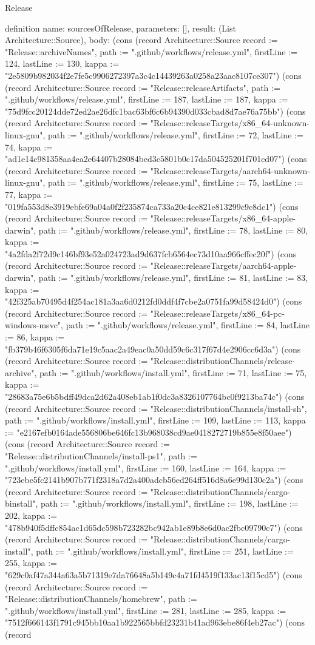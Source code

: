 \begin{lexlean}{Release}
\begin{semanticmodule}
definition{
  name: sourcesOfRelease,
  parameters: [],
  result: (List Architecture::Source),
  body: (cons (record Architecture::Source {record := "Release::archiveNames", path := ".github/workflows/release.yml", firstLine := 124, lastLine := 130, kappa := "2e5809b982034f2e7fe5c9906272397a3c4c14439263a0258a23aac8107ce307"}) (cons (record Architecture::Source {record := "Release::releaseArtifacts", path := ".github/workflows/release.yml", firstLine := 187, lastLine := 187, kappa := "75d9fcc20124dde72ed2ae26dfc1bac63bf6c6b94390d033cbad8d7ae76a75bb"}) (cons (record Architecture::Source {record := "Release::releaseTargets/x86_64-unknown-linux-gnu", path := ".github/workflows/release.yml", firstLine := 72, lastLine := 74, kappa := "ad1e14c981358aa4ea2e64407b28084bed3c5801b0c17da504525201f701cd07"}) (cons (record Architecture::Source {record := "Release::releaseTargets/aarch64-unknown-linux-gnu", path := ".github/workflows/release.yml", firstLine := 75, lastLine := 77, kappa := "019fa553d8e3919ebfe69a04a0f2f235874ca733a20c4ce821e813299c9c8dc1"}) (cons (record Architecture::Source {record := "Release::releaseTargets/x86_64-apple-darwin", path := ".github/workflows/release.yml", firstLine := 78, lastLine := 80, kappa := "4a2fda2f72d9c146bf93e52a024723ad9d637fcb6564ec73d10aa966cffec20f"}) (cons (record Architecture::Source {record := "Release::releaseTargets/aarch64-apple-darwin", path := ".github/workflows/release.yml", firstLine := 81, lastLine := 83, kappa := "42f325ab70495d4f254ac181a3aa6d0212fd0ddf4f7cbe2a0751fa99d58424d0"}) (cons (record Architecture::Source {record := "Release::releaseTargets/x86_64-pc-windows-msvc", path := ".github/workflows/release.yml", firstLine := 84, lastLine := 86, kappa := "fb379b46f6305f6da71e19c5aac2a49eac0a50dd59c6c317f67d4e2906cc6d3a"}) (cons (record Architecture::Source {record := "Release::distributionChannels/release-archive", path := ".github/workflows/install.yml", firstLine := 71, lastLine := 75, kappa := "28683a75e6b5bdff49dca2d62a408eb1ab1f0dc3a8326107764bc0f9213ba74c"}) (cons (record Architecture::Source {record := "Release::distributionChannels/install-sh", path := ".github/workflows/install.yml", firstLine := 109, lastLine := 113, kappa := "e2167efb0164ade556806be646fc13b968038cd9ae0418272719b855e8f50aee"}) (cons (record Architecture::Source {record := "Release::distributionChannels/install-ps1", path := ".github/workflows/install.yml", firstLine := 160, lastLine := 164, kappa := "723ebe5fc2141b907b771f2318a7d2a400adcb56ed264ff516d8a6e99d130c2a"}) (cons (record Architecture::Source {record := "Release::distributionChannels/cargo-binstall", path := ".github/workflows/install.yml", firstLine := 198, lastLine := 202, kappa := "478b940f5dffc854ac1d65dc598b723282bc942ab1e89b8e6d0ac2fbc09790c7"}) (cons (record Architecture::Source {record := "Release::distributionChannels/cargo-install", path := ".github/workflows/install.yml", firstLine := 251, lastLine := 255, kappa := "629c0af47a344a63a5b71319e7da76648a5b149c4a71fd4519f133ac13f15cd5"}) (cons (record Architecture::Source {record := "Release::distributionChannels/homebrew", path := ".github/workflows/install.yml", firstLine := 281, lastLine := 285, kappa := "7512f666143f1791c945bb10aa1b922565bbfd23231b41ad963ebe86f4eb27ac"}) (cons (record }
\end{semanticmodule}
\end{lexlean}
